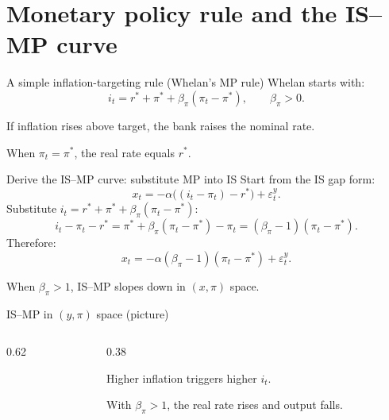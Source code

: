 \documentclass[aspectratio=169,xcolor=dvipsnames]{beamer}
\let\tempone\itemize
\let\temptwo\enditemize
\renewenvironment{itemize}{\tempone\addtolength{\itemsep}{\fill}}{\temptwo}
\newcommand{\axes}[4]{%
  \draw[axis] (#1,0) -- (#2,0);
  \draw[axis] (0,#3) -- (0,#4);
}
\newcommand{\xlabel}[1]{\node[below right] at (2.75,0) {#1};}
\newcommand{\ylabel}[1]{\node[above left] at (0,3.95) {#1};}
\begin{document}
\section{Monetary policy rule and the IS--MP curve}

\begin{frame}{A simple inflation-targeting rule (Whelan's MP rule)}
\small
Whelan starts with:
\[
i_t = r^\ast + \pi^\ast + \beta_\pi(\pi_t-\pi^\ast),
\qquad \beta_\pi>0.
\]
\begin{itemize}
\item If inflation rises above target, the bank raises the nominal rate.
\item When $\pi_t=\pi^\ast$, the real rate equals $r^\ast$.
\end{itemize}
\end{frame}

\begin{frame}{Derive the IS--MP curve: substitute MP into IS}
\small
Start from the IS gap form:
\[
x_t = -\alpha\big((i_t-\pi_t)-r^\ast\big)+\varepsilon_t^y.
\]
Substitute $i_t = r^\ast+\pi^\ast+\beta_\pi(\pi_t-\pi^\ast)$:
\[
i_t-\pi_t-r^\ast = \pi^\ast + \beta_\pi(\pi_t-\pi^\ast) - \pi_t
= (\beta_\pi-1)(\pi_t-\pi^\ast).
\]
Therefore:
\[
x_t = -\alpha(\beta_\pi-1)(\pi_t-\pi^\ast) + \varepsilon_t^y.
\]
\begin{itemize}
\item When $\beta_\pi>1$, IS--MP slopes down in $(x,\pi)$ space.
\end{itemize}
\end{frame}

\begin{frame}{IS--MP in $(y,\pi)$ space (picture)}
\begin{columns}
\begin{column}{0.62\textwidth}
\centering
{}
\end{column}
\begin{column}{0.38\textwidth}
\small
\begin{itemize}
\item Higher inflation triggers higher $i_t$.
\item With $\beta_\pi>1$, the real rate rises and output falls.
\end{itemize}
\end{column}
\end{columns}
\end{frame}
\end{document}
